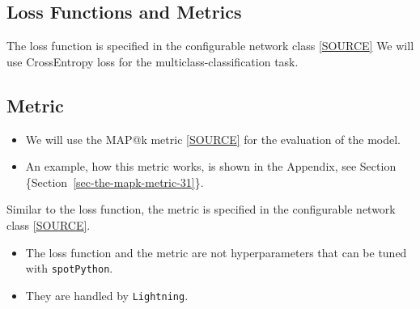 \documentclass[
  letterpaper,
  DIV=11,
  numbers=noendperiod]{scrreprt}
\providecommand{\tightlist}{%
  \setlength{\itemsep}{0pt}\setlength{\parskip}{0pt}}\usepackage{longtable,booktabs,array}
\begin{document}
\hypertarget{sec-loss-functions-and-metrics-31}{%
\subsection{Loss Functions and
Metrics}\label{sec-loss-functions-and-metrics-31}}

The loss function is specified in the configurable network class
\href{https://github.com/sequential-parameter-optimization/spotPython/blob/main/src/spotPython/light/netlightbase.py}{{[}SOURCE{]}}
We will use CrossEntropy loss for the multiclass-classification task.

\hypertarget{sec-metric-31}{%
\subsection{Metric}\label{sec-metric-31}}

\begin{itemize}
\tightlist
\item
  We will use the MAP@k metric
  \href{https://github.com/sequential-parameter-optimization/spotPython/blob/main/src/spotPython/torch/mapk.py}{{[}SOURCE{]}}
  for the evaluation of the model.
\item
  An example, how this metric works, is shown in the Appendix, see
  Section \{Section~\ref{sec-the-mapk-metric-31}\}.
\end{itemize}

Similar to the loss function, the metric is specified in the
configurable network class
\href{https://github.com/sequential-parameter-optimization/spotPython/blob/main/src/spotPython/light/netlightbase.py}{{[}SOURCE{]}}.

\begin{tcolorbox}[enhanced jigsaw, left=2mm, title=\textcolor{quarto-callout-caution-color}{\faFire}\hspace{0.5em}{Caution: Loss Function and Metric in Lightning}, bottomrule=.15mm, titlerule=0mm, breakable, rightrule=.15mm, toprule=.15mm, coltitle=black, colbacktitle=quarto-callout-caution-color!10!white, leftrule=.75mm, arc=.35mm, colframe=quarto-callout-caution-color-frame, bottomtitle=1mm, colback=white, opacitybacktitle=0.6, toptitle=1mm, opacityback=0]

\begin{itemize}
\tightlist
\item
  The loss function and the metric are not hyperparameters that can be
  tuned with \texttt{spotPython}.
\item
  They are handled by \texttt{Lightning}.
\end{itemize}

\end{tcolorbox}
\end{document}
